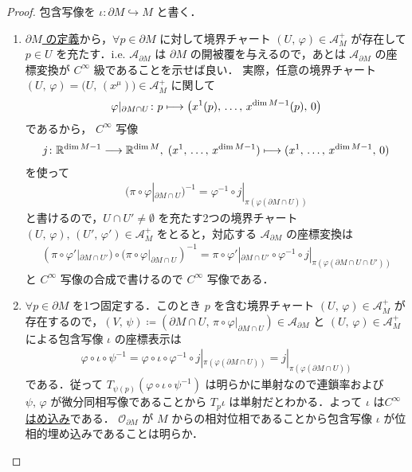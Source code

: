 \documentclass[geometry_main]{subfiles}
\begin{document}
\begin{proof}
	包含写像を $\iota \colon \partial M \hookrightarrow M$ と書く．
	\begin{enumerate}
		\item \hyperref[def:int-manifold-with-boundary]{$\partial M$ の定義}から，$\forall p \in \partial M$ に対して境界チャート $(U,\, \varphi) \in \mathcal{A}_M^+$ が存在して $p \in U$ を充たす．i.e. $\mathcal{A}_{\partial M}$ は $\partial M$ の開被覆を与えるので，あとは $\mathcal{A}_{\partial M}$ の座標変換が $C^\infty$ 級であることを示せば良い．
		実際，任意の境界チャート $(U,\, \varphi) = \bigl(U,\, (x^\mu)\bigr) \in \mathcal{A}_M^+$ に関して
		\begin{align}
			\varphi|_{\partial M \cap U} \colon p \longmapsto \bigl( x^1(p),\, \dots,\, x^{\dim M - 1}(p),\, 0 \bigr) 
		\end{align}
		であるから，
		$C^\infty$ 写像
		\begin{align}
			j \colon \mathbb{R}^{\dim M - 1} \longrightarrow \mathbb{R}^{\dim M},\; (x^1,\, \dots,\, x^{\dim M -1}) \longmapsto  (x^1,\, \dots,\, x^{\dim M -1},\, 0) 
		\end{align}
		を使って
		\begin{align}
			(\pi \circ \varphi|_{\partial M \cap U})^{-1} = \varphi^{-1} \circ j|_{\pi(\varphi(\partial M \cap U))}
		\end{align}
		と書けるので，$U \cap U' \neq \emptyset$ を充たす2つの境界チャート $(U,\, \varphi),\, (U',\, \varphi') \in \mathcal{A}_M^+$ をとると，対応する $\mathcal{A}_{\partial M}$ の座標変換は
		\begin{align}
			(\pi \circ \varphi'|_{\partial M \cap U'}) \circ (\pi \circ \varphi|_{\partial M \cap U})^{-1} = \pi \circ \varphi'|_{\partial M \cap U'} \circ \varphi^{-1} \circ j|_{\pi(\varphi(\partial M \cap U \cap U'))}
		\end{align}
		と $C^\infty$ 写像の合成で書けるので $C^\infty$ 写像である．

		\item $\forall p \in \partial M$ を1つ固定する．このとき $p$ を含む境界チャート $(U,\, \varphi) \in \mathcal{A}_M^+$ が存在するので，$(V,\, \psi) \coloneqq (\partial M \cap U,\, \pi \circ \varphi|_{\partial M \cap U}) \in \mathcal{A}_{\partial M}$ と $(U,\, \varphi) \in \mathcal{A}_M^+$ による包含写像 $\iota$ の座標表示は
		\begin{align}
			\varphi \circ \iota \circ \psi^{-1} = \varphi \circ \iota \circ \varphi^{-1} \circ j|_{\pi(\varphi(\partial M \cap U))} = j|_{\pi(\varphi(\partial M \cap U))}
		\end{align}
		である．従って $T_{\psi(p)} (\varphi \circ \iota \circ \psi^{-1})$ は明らかに単射なので連鎖率および $\psi,\, \varphi$ が微分同相写像であることから $T_p \iota$ は単射だとわかる．よって $\iota$ は\hyperref[def:submersion-smooth]{$C^\infty$ はめ込み}である．
		$\mathcal{O}_{\partial M}$ が $M$ からの相対位相であることから包含写像 $\iota$ が位相的埋め込みであることは明らか．
	\end{enumerate}
	
\end{proof}
\end{document}
